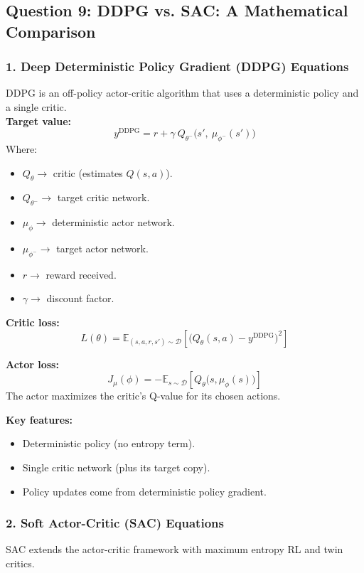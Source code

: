 \documentclass[12pt]{article}
\begin{document}
\subsection*{Question 9: DDPG vs. SAC: A Mathematical Comparison}

\subsubsection*{1. Deep Deterministic Policy Gradient (DDPG) Equations}
DDPG is an off-policy actor-critic algorithm that uses a deterministic policy and a single critic. \\

\textbf{Target value:}
\[
    y^{\text{DDPG}} = r + \gamma \ Q_{\theta^-} \big( s', \ \mu_{\phi^-}(s') \big)
\]
Where:
\begin{itemize}
    \item $Q_{\theta} \to$ critic (estimates $Q(s,a)$).
    \item $Q_{\theta^-} \to$ target critic network.
    \item $\mu_{\phi} \to$ deterministic actor network.
    \item $\mu_{\phi^-} \to$ target actor network.
    \item $r \to$ reward received.
    \item $\gamma \to$ discount factor.
\end{itemize}

\textbf{Critic loss:}
\[
    L(\theta) = \mathbb{E}_{(s,a,r,s') \sim \mathcal{D}} \left[ \big( Q_{\theta}(s,a) - y^{\text{DDPG}} \big)^2 \right]
\]

\textbf{Actor loss:}
\[
    J_{\mu}(\phi) = - \mathbb{E}_{s \sim \mathcal{D}} \left[ Q_{\theta}\big(s, \mu_{\phi}(s)\big) \right]
\]
The actor maximizes the critic's Q-value for its chosen actions.

\textbf{Key features:}
\begin{itemize}
    \item Deterministic policy (no entropy term).
    \item Single critic network (plus its target copy).
    \item Policy updates come from deterministic policy gradient.
\end{itemize}

\subsubsection*{2. Soft Actor-Critic (SAC) Equations}
SAC extends the actor-critic framework with maximum entropy RL and twin critics. \\
\end{document}
